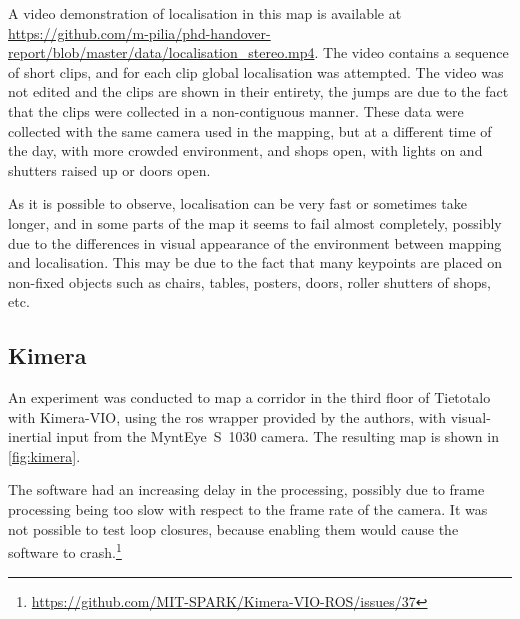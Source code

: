 \documentclass[11pt, letterpaper, twoside]{article}
\begin{document}
A video demonstration of localisation in this map is available at
\url{https://github.com/m-pilia/phd-handover-report/blob/master/data/localisation_stereo.mp4}.
The video contains a sequence of short clips, and for each clip global
localisation was attempted. The video was not edited and the clips are shown in
their entirety, the jumps are due to the fact that the clips were collected in
a non-contiguous manner. These data were collected with the same camera used in
the mapping, but at a different time of the day, with more crowded environment,
and shops open, with lights on and shutters raised up or doors open.

As it is possible to observe, localisation can be very fast or sometimes take
longer, and in some parts of the map it seems to fail almost completely,
possibly due to the differences in visual appearance of the environment between
mapping and localisation. This may be due to the fact that many keypoints are
placed on non-fixed objects such as chairs, tables, posters, doors, roller
shutters of shops, etc.

\subsection{Kimera}

An experiment was conducted to map a corridor in the third floor of Tietotalo
with Kimera-VIO, using the \gls{ros} wrapper provided by the authors, with
visual-inertial input from the MyntEye~S~1030 camera. The resulting map is
shown in \cref{fig:kimera}.

The software had an increasing delay in the processing, possibly due to frame
processing being too slow with respect to the frame rate of the camera. It was
not possible to test loop closures, because enabling them would cause the
software to
crash.\footnote{\url{https://github.com/MIT-SPARK/Kimera-VIO-ROS/issues/37}}
\end{document}
